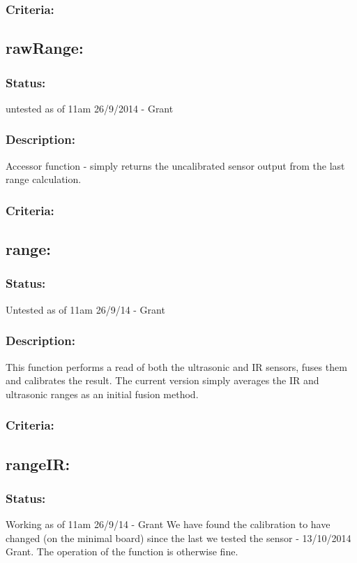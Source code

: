 \documentclass[]{report}
\begin{document}
\subsubsection{Criteria:}

\subsection{rawRange:}
\subsubsection{Status:}
untested as of 11am 26/9/2014 - Grant

\subsubsection{Description:}
Accessor function - simply returns the uncalibrated sensor output from the last range calculation.

\subsubsection{Criteria:}

\subsection{range:}
\subsubsection{Status:}
Untested as of 11am 26/9/14 - Grant

\subsubsection{Description:}
This function performs a read of both the ultrasonic and IR sensors, fuses them and calibrates the result. The current version simply averages the IR and ultrasonic ranges as an initial fusion method.

\subsubsection{Criteria:}

\subsection{rangeIR:}
\subsubsection{Status:}
Working as of 11am 26/9/14 - Grant \newline
We have found the calibration to have changed (on the minimal board) since the last we tested the sensor - 13/10/2014 Grant. The operation of the function is otherwise fine.
\end{document}
